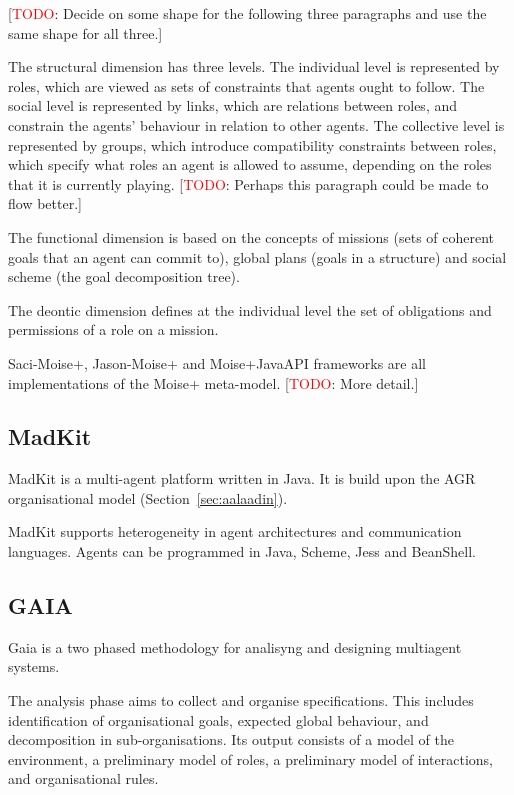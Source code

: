 \documentclass{article}
\newcommand{\todo}[1]{[\textcolor{red}{TODO}: #1]}
\begin{document}
\todo{Decide on some shape for the following three paragraphs
and use the same shape for all three.}

The structural dimension has three levels. The individual level
is represented by roles, which are viewed as sets of constraints
that agents ought to follow. The social level is represented
by links, which are relations between roles, and constrain the
agents' behaviour in relation to other agents. The collective
level is represented by groups, which introduce compatibility
constraints between roles, which specify what roles an agent is
allowed to assume, depending on the roles that it is currently
playing. \todo{Perhaps this paragraph could be made to flow
better.}

The functional dimension is based on the concepts of missions
(sets of coherent goals that an agent can commit to), global
plans (goals in a structure) and social scheme (the goal
decomposition tree). 

The deontic dimension defines at the individual level the set of
obligations and permissions of a role on a mission.

Saci-Moise+, Jason-Moise+ and Moise+JavaAPI frameworks are all
implementations of the Moise+ meta-model. \todo{More detail.}

\subsection{MadKit} 

MadKit is a multi-agent platform written in Java. It is build upon
the AGR organisational model (Section~\ref{sec:aalaadin}).

MadKit supports heterogeneity in agent architectures and
communication languages. Agents can be programmed in Java,
Scheme, Jess and BeanShell.

\subsection{GAIA}

Gaia is a two phased methodology for analisyng and designing multiagent
systems.

The analysis phase aims to collect and organise specifications. This includes
identification of organisational goals, expected global behaviour, and
decomposition in sub-organisations. Its output consists of a model of the
environment, a preliminary model of roles, a preliminary model of interactions,
and organisational rules.
\end{document}
